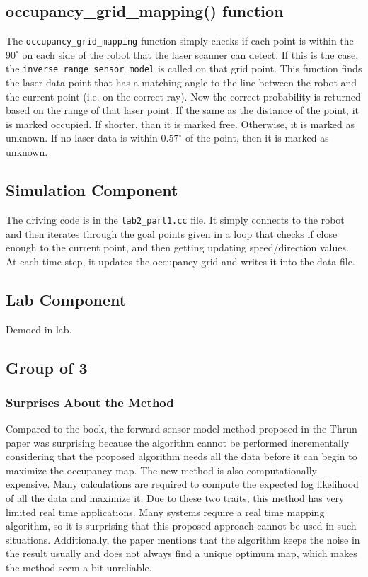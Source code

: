 \documentclass[10pt, titlepage, onecolumn, fleqn]{article}
\begin{document}
\subsection{occupancy\_grid\_mapping() function}

The \verb|occupancy_grid_mapping| function simply checks if each point is within the $90^\circ$ on each side of the robot that the laser scanner can detect. If this is the case, the \verb|inverse_range_sensor_model| is called on that grid point. This function finds the laser data point that has a matching angle to the line between the robot and the current point (i.e. on the correct ray). Now the correct probability is returned based on the range of that laser point. If the same as the distance of the point, it is marked occupied. If shorter, than it is marked free. Otherwise, it is marked as unknown. If no laser data is within $0.57^\circ$ of the point, then it is marked as unknown.

\subsection{Simulation Component}

The driving code is in the \verb|lab2_part1.cc| file. It simply connects to the robot and then iterates through the goal points given in a loop that checks if close enough to the current point, and then getting updating speed/direction values. At each time step, it updates the occupancy grid and writes it into the data file.

\subsection{Lab Component}

Demoed in lab.

\subsection{Group of 3}

\subsubsection{Surprises About the Method}
Compared to the book, the forward sensor model method proposed in the Thrun paper was surprising because the algorithm cannot be performed incrementally considering that the proposed algorithm needs all the data before it can begin to maximize the occupancy map. The new method is also computationally expensive. Many calculations are required to compute the expected log likelihood of all the data and maximize it. Due to these two traits, this method has very limited real time applications. Many systems require a real time mapping algorithm, so it is surprising that this proposed approach cannot be used in such situations. Additionally, the paper mentions that the algorithm keeps the noise in the result usually and does not always find a unique optimum map, which makes the method seem a bit unreliable.
\end{document}
